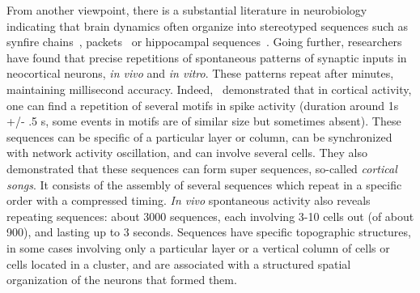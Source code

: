 \documentclass[brainsci, %
               review,submit,pdftex,moreauthors
               ]{Definitions/mdpi}
\begin{document}
From another viewpoint, there is a substantial literature in neurobiology indicating that brain dynamics often organize into stereotyped sequences such as synfire chains~\citep{ikegaya_synfire_2004}, packets~\citep{luczak_sequential_2007} or hippocampal sequences~\citep{pastalkova_internally_2008}. %
Going further, researchers have found that  precise repetitions of spontaneous patterns of synaptic inputs in neocortical neurons, \textit{in vivo} and \textit{in vitro}. These patterns repeat after minutes, maintaining millisecond accuracy. Indeed,~\citet{ikegaya_synfire_2004} demonstrated that in cortical activity, one can find a repetition of several motifs in spike activity (duration around 1s +/- .5 s, some events in motifs are of similar size but sometimes absent). These sequences can be specific of a particular layer or column, can be synchronized with network activity oscillation, and can involve several cells. They also demonstrated that these sequences can form super sequences, so-called \emph{cortical songs}. It consists of the assembly of several sequences which repeat in a specific order with a compressed timing. \emph{In vivo} spontaneous activity also reveals repeating sequences: about 3000 sequences, each involving 3-10 cells out (of about 900), and lasting up to 3 seconds. Sequences have specific topographic structures, in some cases involving only a particular layer or a vertical column of cells or cells located in a cluster, and are associated with a structured spatial organization of the neurons that formed them. %
\end{document}

